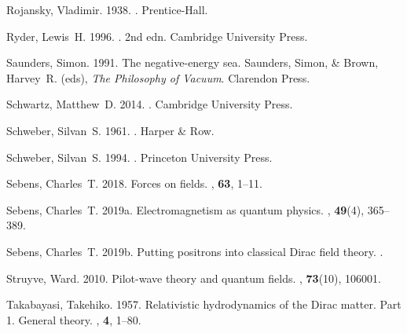 \documentclass[12pt,secnumarabic,amsmath,amssymb,balancelastpage,nofootinbib]{article}
\begin{document}
\begin{thebibliography}{}
Rojansky, Vladimir. 1938.
.
\newblock Prentice-Hall.

Ryder, Lewis~H. 1996.
. 2nd edn.
\newblock Cambridge University Press.

Saunders, Simon. 1991.
\newblock The negative-energy sea.
 Saunders, Simon, \& Brown, Harvey~R. (eds),
  {\em The Philosophy of Vacuum}.
\newblock Clarendon Press.

Schwartz, Matthew~D. 2014.
.
\newblock Cambridge University Press.

Schweber, Silvan~S. 1961.
.
\newblock Harper \& Row.

Schweber, Silvan~S. 1994.
.
\newblock Princeton University Press.

Sebens, Charles~T. 2018.
\newblock Forces on fields.
, {\bf 63},
  1--11.

Sebens, Charles~T. 2019a.
\newblock Electromagnetism as quantum physics.
, {\bf 49}(4), 365--389.

Sebens, Charles~T. 2019b.
\newblock Putting positrons into classical Dirac field theory.
.

Struyve, Ward. 2010.
\newblock Pilot-wave theory and quantum fields.
, {\bf 73}(10), 106001.

Takabayasi, Takehiko. 1957.
\newblock Relativistic hydrodynamics of the Dirac matter. Part 1. General
  theory.
, {\bf 4}, 1--80.


\end{thebibliography}
\end{document}
